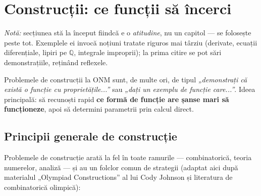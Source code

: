 \section{Construcții: ce funcții să încerci}

\emph{Notă:} secțiunea stă la început fiindcă e o \emph{atitudine}, nu un capitol --- se folosește peste tot. Exemplele ei invocă noțiuni tratate riguros mai târziu (derivate, ecuații diferențiale, lipiri pe $\mathbb{Q}$, integrale improprii); la prima citire se pot sări demonstrațiile, reținând reflexele.

Problemele de construcții la ONM sunt, de multe ori, de tipul \emph{„demonstrați că există o funcție cu proprietățile...''} sau \emph{„dați un exemplu de funcție care...''}. Ideea principală: să recunoști rapid \textbf{ce formă de funcție are șanse mari să funcționeze}, apoi să determini parametrii prin calcul direct.

\subsection{Principii generale de construcție}

Problemele de construcție arată la fel în toate ramurile --- combinatorică, teoria numerelor, analiză --- și au un folclor comun de strategii (adaptat aici după materialul „Olympiad Constructions'' al lui Cody Johnson și literatura de combinatorică olimpică):

